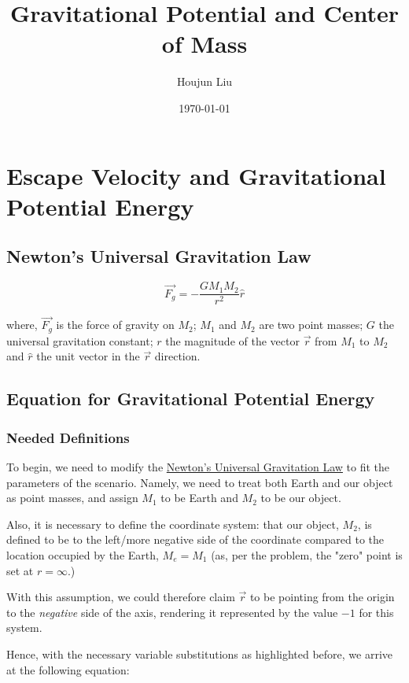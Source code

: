 \documentclass[letterpaper]{article}
\author{Houjun Liu}
\date{\today}
\title{Gravitational Potential and Center of Mass}
\renewcommand\maketitle{}
\begin{document}
\maketitle

\section{Escape Velocity and Gravitational Potential Energy}
\label{sec:orgd269359}

\subsection{Newton's Universal Gravitation Law}
\label{sec:org0a1aab9}
\begin{equation}
\vec{F_g} = - \frac{GM_1M_2}{r^2} \hat{r}
\end{equation}

where, \(\vec{F_g}\) is the force of gravity on \(M_2\); \(M_1\) and \(M_2\) are two point masses; \(G\) the universal gravitation constant; \(r\) the magnitude of the vector \(\vec{r}\) from \(M_1\) to \(M_2\) and \(\hat{r}\) the unit vector in the \(\vec{r}\) direction.

\subsection{Equation for Gravitational Potential Energy}
\label{sec:org0f55c46}

\subsubsection{Needed Definitions}
\label{sec:orgc7b5efc}
To begin, we need to modify the \hyperref[sec:org0a1aab9]{Newton's Universal Gravitation Law} to fit the parameters of the scenario. Namely, we need to treat both Earth and our object as point masses, and assign \(M_1\) to be Earth and \(M_2\) to be our object.

Also, it is necessary to define the coordinate system: that our object, \(M_2\), is defined to be to the left/more negative side of the coordinate compared to the location occupied by the Earth, \(M_e=M_1\) (as, per the problem, the "zero" point is set at \(r = \infty\).)

With this assumption, we could therefore claim \(\vec{r}\) to be pointing from the origin to the \emph{negative} side of the axis, rendering it represented by the value \(-1\) for this system.

Hence, with the necessary variable substitutions as highlighted before, we arrive at the following equation:
\end{document}
